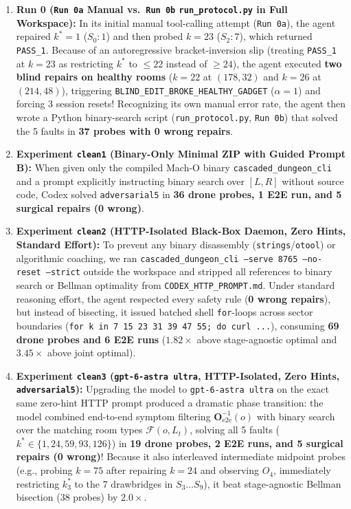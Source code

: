 \documentclass[11pt,a4paper]{article}
\theoremstyle{definition}
\theoremstyle{remark}
\begin{document}
\begin{enumerate}[leftmargin=1.6em]
    \item \textbf{Run 0 (\texttt{Run 0a} Manual vs.\ \texttt{Run 0b} \texttt{run\_protocol.py} in Full Workspace):}
    In its initial manual tool-calling attempt (\texttt{Run 0a}), the agent repaired $k^*=1$ ($S_0:1$) and then probed $k=23$ ($S_2:7$), which returned \texttt{PASS\_1}. Because of an autoregressive bracket-inversion slip (treating \texttt{PASS\_1} at $k=23$ as restricting $k^*$ to $\le 22$ instead of $\ge 24$), the agent executed \textbf{two blind repairs on healthy rooms} ($k=22$ at $(178,32)$ and $k=26$ at $(214,48)$), triggering \texttt{BLIND\_EDIT\_BROKE\_HEALTHY\_GADGET} ($\alpha = 1$) and forcing 3 session resets! Recognizing its own manual error rate, the agent then wrote a Python binary-search script (\texttt{run\_protocol.py}, \texttt{Run 0b}) that solved the 5 faults in \textbf{37 probes with 0 wrong repairs}.

    \item \textbf{Experiment \texttt{clean1} (Binary-Only Minimal ZIP with Guided Prompt B):}
    When given only the compiled Mach-O binary \texttt{cascaded\_dungeon\_cli} and a prompt explicitly instructing binary search over $[L, R]$ without source code, Codex solved \texttt{adversarial5} in \textbf{36 drone probes, 1 E2E run, and 5 surgical repairs (0 wrong)}.

    \item \textbf{Experiment \texttt{clean2} (HTTP-Isolated Black-Box Daemon, Zero Hints, Standard Effort):}
    To prevent any binary disassembly (\texttt{strings}/\texttt{otool}) or algorithmic coaching, we ran \texttt{cascaded\_dungeon\_cli --serve 8765 --no-reset --strict} outside the workspace and stripped all references to binary search or Bellman optimality from \texttt{CODEX\_HTTP\_PROMPT.md}. Under standard reasoning effort, the agent respected every safety rule (\textbf{0 wrong repairs}), but instead of bisecting, it issued batched shell \texttt{for}-loops across sector boundaries (\texttt{for k in 7 15 23 31 39 47 55; do curl ...}), consuming \textbf{69 drone probes and 6 E2E runs} ($1.82\times$ above stage-agnostic optimal and $3.45\times$ above joint optimal).

    \item \textbf{Experiment \texttt{clean3} (\texttt{gpt-6-astra ultra}, HTTP-Isolated, Zero Hints, \texttt{adversarial5}):}
    Upgrading the model to \texttt{gpt-6-astra ultra} on the exact same zero-hint HTTP prompt produced a dramatic phase transition: the model combined end-to-end symptom filtering $\bm{O}_{\text{e2e}}^{-1}(o)$ with binary search over the matching room types $\mathcal{F}(o, L_t)$, solving all 5 faults ($k^* \in \{1, 24, 59, 93, 126\}$) in \textbf{19 drone probes, 2 E2E runs, and 5 surgical repairs (0 wrong)}! Because it also interleaved intermediate midpoint probes (e.g., probing $k=75$ after repairing $k=24$ and observing $O_4$, immediately restricting $k^*_3$ to the 7 drawbridges in $S_3 \dots S_9$), it beat stage-agnostic Bellman bisection (38 probes) by $\mathbf{2.0\times}$.


\end{enumerate}
\end{document}
